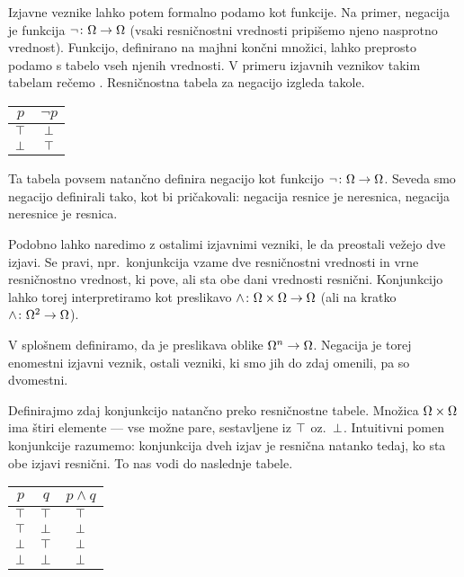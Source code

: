 		Izjavne veznike lahko potem formalno podamo kot funkcije. Na primer, negacija je funkcija $\lnot\colon \Omega \to \Omega$ (vsaki resničnostni vrednosti pripišemo njeno nasprotno vrednost). Funkcijo, definirano na majhni končni množici, lahko preprosto podamo s tabelo vseh njenih vrednosti. V primeru izjavnih veznikov takim tabelam rečemo . Resničnostna tabela za negacijo izgleda takole.
		\begin{center}
			\begin{tabular}{c|c}
				$p$ & $\lnot{p}$ \\
				\hline
				$\top$ & $\bot$ \\
				$\bot$ & $\top$
			\end{tabular}
		\end{center}
		Ta tabela povsem natančno definira negacijo kot funkcijo $\lnot\colon \Omega \to \Omega$. Seveda smo negacijo definirali tako, kot bi pričakovali: negacija resnice je neresnica, negacija neresnice je resnica.
		
		Podobno lahko naredimo z ostalimi izjavnimi vezniki, le da preostali vežejo dve izjavi. Se pravi, npr.~konjunkcija vzame dve resničnostni vrednosti in vrne resničnostno vrednost, ki pove, ali sta obe dani vrednosti resnični. Konjunkcijo lahko torej interpretiramo kot preslikavo $\land\colon \Omega \times \Omega \to \Omega$ (ali na kratko $\land\colon \Omega^2 \to \Omega$).
		
		V splošnem definiramo, da je  preslikava oblike $\Omega^n \to \Omega$. Negacija je torej enomestni izjavni veznik, ostali vezniki, ki smo jih do zdaj omenili, pa so dvomestni.
		
		Definirajmo zdaj konjunkcijo natančno preko resničnostne tabele. Množica $\Omega \times \Omega$ ima štiri elemente --- vse možne pare, sestavljene iz $\top$ oz.~$\bot$. Intuitivni pomen konjunkcije razumemo: konjunkcija dveh izjav je resnična natanko tedaj, ko sta obe izjavi resnični. To nas vodi do naslednje tabele.
		\begin{center}
			\begin{tabular}{cc|c}
				$p$ & $q$ & $p \land q$ \\
				\hline
				$\top$ & $\top$ & $\top$ \\
				$\top$ & $\bot$ & $\bot$ \\
				$\bot$ & $\top$ & $\bot$ \\
				$\bot$ & $\bot$ & $\bot$
			\end{tabular}
		\end{center}
		

